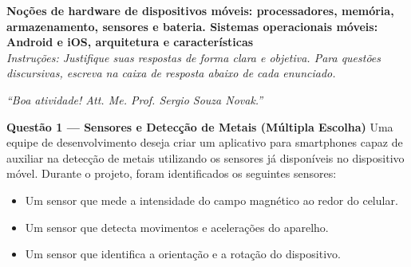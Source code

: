\documentclass[12pt]{article}
\begin{document}

\vspace*{0.2cm}

\begin{center}
  {\Large \textbf{Noções de hardware de dispositivos móveis: processadores, memória, armazenamento, sensores e bateria. Sistemas operacionais móveis: Android e iOS, arquitetura e características}}\\[0.2cm]
  \textit{Instruções: Justifique suas respostas de forma clara e objetiva.
  Para questões discursivas, escreva na caixa de resposta abaixo de cada enunciado.}
\end{center}

\vspace{0.4cm}

\begin{center}
  \textit{``Boa atividade! Att. Me. Prof. Sergio Souza Novak.''}
\end{center}


\textbf{Questão 1 — Sensores e Detecção de Metais (Múltipla Escolha)}
Uma equipe de desenvolvimento deseja criar um aplicativo para smartphones capaz de auxiliar
na detecção de metais utilizando os sensores já disponíveis no dispositivo móvel.
Durante o projeto, foram identificados os seguintes sensores:

\begin{itemize}[leftmargin=1.5em]
  \item Um sensor que mede a intensidade do campo magnético ao redor do celular.
  \item Um sensor que detecta movimentos e acelerações do aparelho.
  \item Um sensor que identifica a orientação e a rotação do dispositivo.
\end{itemize}

\vspace{0.4cm}
\end{document}
